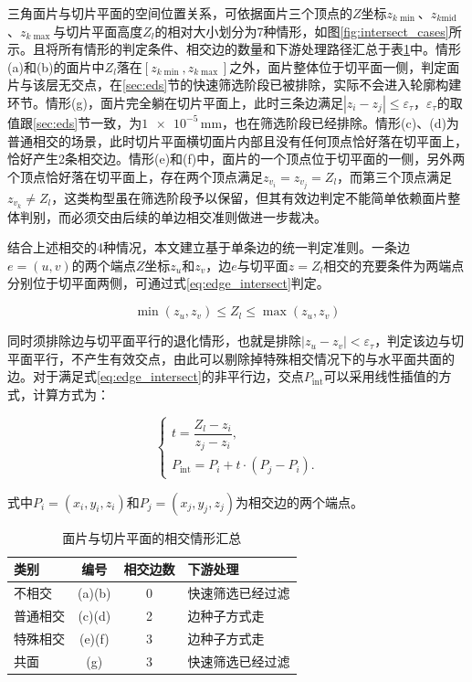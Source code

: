 三角面片与切片平面的空间位置关系，可依据面片三个顶点的$Z$坐标$z_{k\min}$、$z_{k\mathrm{mid}}$、$z_{k\max}$与切片平面高度$Z_{l}$的相对大小划分为7种情形，如图\ref{fig:intersect_cases}所示。且将所有情形的判定条件、相交边的数量和下游处理路径汇总于表\ref{tab:intersect_cases}中。情形(a)和(b)的面片中$Z_{l}$落在$[z_{k\min},z_{k\max}]$之外，面片整体位于切平面一侧，判定面片与该层无交点，在\ref{sec:eds}节的快速筛选阶段已被排除，实际不会进入轮廓构建环节。情形(g)，面片完全躺在切片平面上，此时三条边满足$|z_{i}-z_{j}|\le\varepsilon_{\tau}$，$\varepsilon_{\tau}$的取值跟\ref{sec:eds}节一致，为$\num{1e-5}\,\mathrm{mm}$，也在筛选阶段已经排除。情形(c)、(d)为普通相交的场景，此时切片平面横切面片内部且没有任何顶点恰好落在切平面上，恰好产生2条相交边。情形(e)和(f)中，面片的一个顶点位于切平面的一侧，另外两个顶点恰好落在切平面上，存在两个顶点满足$z_{v_{i}}=z_{v_{j}}=Z_{l}$，而第三个顶点满足$z_{v_{k}}\neq Z_{l}$，这类构型虽在筛选阶段予以保留，但其有效边判定不能简单依赖面片整体判别，而必须交由后续的单边相交准则做进一步裁决。

结合上述相交的4种情况，本文建立基于单条边的统一判定准则。一条边$e=(u,v)$的两个端点$Z$坐标$z_{u}$和$z_{v}$，边$e$与切平面$z=Z_{l}$相交的充要条件为两端点分别位于切平面两侧，可通过式\eqref{eq:edge_intersect}判定。

\begin{equation}
\min(z_{u},z_{v})\le Z_{l}\le\max(z_{u},z_{v}) \label{eq:edge_intersect}
\end{equation}

同时须排除边与切平面平行的退化情形，也就是排除$|z_{u}-z_{v}|<\varepsilon_{\tau}$，判定该边与切平面平行，不产生有效交点，由此可以剔除掉特殊相交情况下的与水平面共面的边。对于满足式\eqref{eq:edge_intersect}的非平行边，交点$P_{\mathrm{int}}$可以采用线性插值的方式，计算方式为：

\begin{equation}
\begin{cases}
t=\dfrac{Z_l-z_i}{z_j-z_i},\\[12pt]
P_{\mathrm{int}}=P_i+t\cdot(P_j-P_i).
\end{cases} \label{eq:linear_interp}
\end{equation}

式中$P_{i}=(x_{i},y_{i},z_{i})$和$P_{j}=(x_{j},y_{j},z_{j})$为相交边的两个端点。

\begin{table}[htbp]
\caption{面片与切片平面的相交情形汇总}
\label{tab:intersect_cases}
\vspace{0.5em}\centering\wuhao
\begin{tabularx}{\textwidth}{@{}>{\centering\arraybackslash}X c c >{\centering\arraybackslash}X@{}}
\toprule
类别 & 编号 & 相交边数 & 下游处理 \\
\midrule
不相交   & (a)(b) & 0 & 快速筛选已经过滤 \\
普通相交 & (c)(d) & 2 & 边种子方式走 \\
特殊相交 & (e)(f) & 3 & 边种子方式走 \\
共面     & (g)   & 3 & 快速筛选已经过滤 \\
\bottomrule
\end{tabularx}
\end{table}

